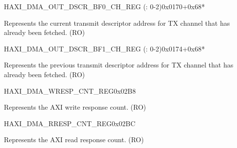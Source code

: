 \begin{register}{H}{AXI\_DMA\_OUT\_DSCR\_BF0\_CH\_REG (: 0-2)}{0x0170+0x68*}\label{regdesc:AXIDMAOUTDSCRBF0CHNREG}
%
\regnewline%
\begin{regdesc}\begin{reglist}
\label{fielddesc:AXIDMAOUTLINKDSCRBF0CHN}\item [AXI\_DMA\_OUTLINK\_DSCR\_BF0\_CH\regindex{n}] Represents the current transmit descriptor address for TX channel  that has already been fetched. (RO)
\end{reglist}\end{regdesc}
\end{register}


\begin{register}{H}{AXI\_DMA\_OUT\_DSCR\_BF1\_CH\_REG (: 0-2)}{0x0174+0x68*}\label{regdesc:AXIDMAOUTDSCRBF1CHNREG}
%
\regnewline%
\begin{regdesc}\begin{reglist}
\label{fielddesc:AXIDMAOUTLINKDSCRBF1CHN}\item [AXI\_DMA\_OUTLINK\_DSCR\_BF1\_CH\regindex{n}] Represents the previous transmit descriptor address for TX channel  that has already been fetched. (RO)
\end{reglist}\end{regdesc}
\end{register}


\begin{register}{H}{AXI\_DMA\_WRESP\_CNT\_REG}{0x02B8}\label{regdesc:AXIDMAWRESPCNTREG}
%
%
\regnewline%
\begin{regdesc}\begin{reglist}
\label{fielddesc:AXIDMAWRESPCNT}\item [AXI\_DMA\_WRESP\_CNT] Represents the AXI write response count. (RO)
\end{reglist}\end{regdesc}
\end{register}


\begin{register}{H}{AXI\_DMA\_RRESP\_CNT\_REG}{0x02BC}\label{regdesc:AXIDMARRESPCNTREG}
%
%
\regnewline%
\begin{regdesc}\begin{reglist}
\label{fielddesc:AXIDMARRESPCNT}\item [AXI\_DMA\_RRESP\_CNT] Represents the AXI read response count. (RO)
\end{reglist}\end{regdesc}
\end{register}


